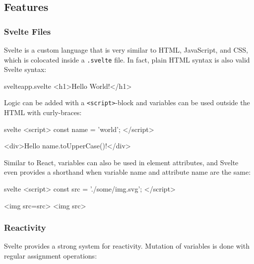 \subsection{Features}

\subsubsection{Svelte Files}

Svelte is a custom language that is very similar to HTML, JavaScript, and CSS, which is colocated inside a \texttt{.svelte} file. In fact, plain HTML syntax is also valid Svelte syntax:

\begin{myminted}{svelte}{app.svelte}
<h1>Hello World!</h1> 
\end{myminted}

Logic can be added with a \texttt{<script>}-block and variables can be used outside the HTML with curly-braces:

\begin{myminted}{svelte}{}
<script>
    const name = 'world';
</script>

<div>Hello {name.toUpperCase()}!</div>
\end{myminted}

Similar to React, variables can also be used in element attributes, and Svelte even provides a shorthand when variable name and attribute name are the same:
\begin{myminted}{svelte}{}
<script>
    const src = './some/img.svg';
</script>

<img src={src}>
<img {src}> 
\end{myminted}

\subsubsection{Reactivity}

Svelte provides a strong system for reactivity. Mutation of variables is done with regular assignment operations:

